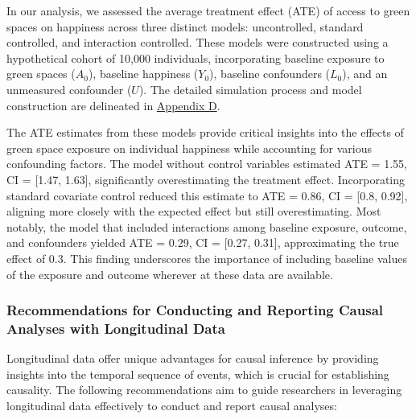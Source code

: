 \documentclass[
  singlecolumn]{article}
\begin{document}
In our analysis, we assessed the average treatment effect (ATE) of
access to green spaces on happiness across three distinct models:
uncontrolled, standard controlled, and interaction controlled. These
models were constructed using a hypothetical cohort of 10,000
individuals, incorporating baseline exposure to green spaces (\(A_0\)),
baseline happiness (\(Y_0\)), baseline confounders (\(L_0\)), and an
unmeasured confounder (\(U\)). The detailed simulation process and model
construction are delineated in
\hyperref[appendix-simulate-longitudinal-ate]{Appendix D}.

The ATE estimates from these models provide critical insights into the
effects of green space exposure on individual happiness while accounting
for various confounding factors. The model without control variables
estimated ATE = 1.55, CI = {[}1.47, 1.63{]}, significantly
overestimating the treatment effect. Incorporating standard covariate
control reduced this estimate to ATE = 0.86, CI = {[}0.8, 0.92{]},
aligning more closely with the expected effect but still overestimating.
Most notably, the model that included interactions among baseline
exposure, outcome, and confounders yielded ATE = 0.29, CI = {[}0.27,
0.31{]}, approximating the true effect of 0.3. This finding underscores
the importance of including baseline values of the exposure and outcome
wherever at these data are available.

\subsubsection{Recommendations for Conducting and Reporting Causal
Analyses with Longitudinal
Data}\label{recommendations-for-conducting-and-reporting-causal-analyses-with-longitudinal-data}

Longitudinal data offer unique advantages for causal inference by
providing insights into the temporal sequence of events, which is
crucial for establishing causality. The following recommendations aim to
guide researchers in leveraging longitudinal data effectively to conduct
and report causal analyses:
\end{document}
